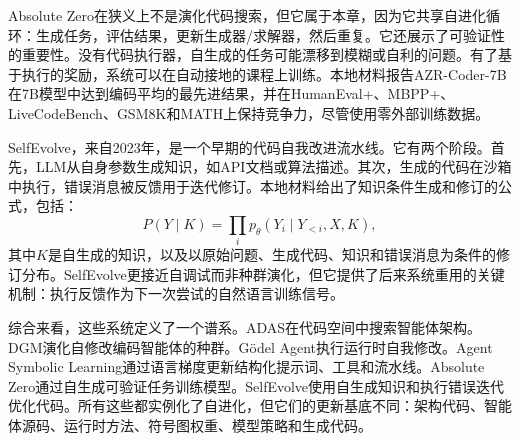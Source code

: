 Absolute Zero在狭义上不是演化代码搜索，但它属于本章，因为它共享自进化循环：生成任务，评估结果，更新生成器/求解器，然后重复。它还展示了可验证性的重要性。没有代码执行器，自生成的任务可能漂移到模糊或自利的问题。有了基于执行的奖励，系统可以在自动接地的课程上训练。本地材料报告AZR-Coder-7B在7B模型中达到编码平均的最先进结果，并在HumanEval+、MBPP+、LiveCodeBench、GSM8K和MATH上保持竞争力，尽管使用零外部训练数据。

SelfEvolve，来自2023年，是一个早期的代码自我改进流水线\cite{selfevolve2023}。它有两个阶段。首先，LLM从自身参数生成知识，如API文档或算法描述。其次，生成的代码在沙箱中执行，错误消息被反馈用于迭代修订。本地材料给出了知识条件生成和修订的公式，包括：
\begin{equation}
  P(Y\mid K)=\prod_i p_\theta(Y_i\mid Y_{<i},X,K),
\end{equation}
其中$K$是自生成的知识，以及以原始问题、生成代码、知识和错误消息为条件的修订分布。SelfEvolve更接近自调试而非种群演化，但它提供了后来系统重用的关键机制：执行反馈作为下一次尝试的自然语言训练信号。

综合来看，这些系统定义了一个谱系。ADAS在代码空间中搜索智能体架构。DGM演化自修改编码智能体的种群。G{\"o}del Agent执行运行时自我修改。Agent Symbolic Learning通过语言梯度更新结构化提示词、工具和流水线。Absolute Zero通过自生成可验证任务训练模型。SelfEvolve使用自生成知识和执行错误迭代优化代码。所有这些都实例化了自进化，但它们的更新基底不同：架构代码、智能体源码、运行时方法、符号图权重、模型策略和生成代码。

